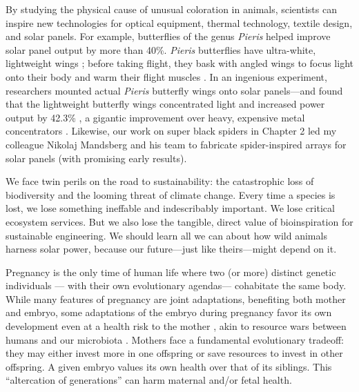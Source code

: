 \vspace{5mm}
\noindent{\textcolor{SchoolColor}{1.3 Bio-inspired Technology}}

By studying the physical cause of unusual coloration in animals, scientists can inspire new technologies for optical equipment, thermal technology, textile design, and solar panels\cite{Dou2020}. For example, butterflies of the genus \emph{Pieris} helped improve solar panel output by more than 40\%. \emph{Pieris} butterflies have ultra-white, lightweight wings \cite{Stavenga2004}; before taking flight, they bask with angled wings to focus light onto their body and warm their flight muscles \cite{Kingsolver1985}. In an ingenious experiment, researchers mounted actual \emph{Pieris} butterfly wings onto solar panels—and found that the  lightweight butterfly wings concentrated light and increased power output by 42.3\%  \cite{Shanks2015}, a gigantic improvement over heavy, expensive metal concentrators \cite{Barber2008, Tang2011}. Likewise, our work on super black spiders in Chapter 2 led my colleague Nikolaj Mandsberg and his team to fabricate spider-inspired arrays for solar panels (with promising early results). 

We face twin perils on the road to sustainability: the catastrophic loss of biodiversity and the looming threat of climate change. Every time a species is lost, we lose something ineffable and indescribably important. We lose critical ecosystem services. But we also lose the tangible, direct value of bioinspiration for sustainable engineering. We should learn all we can about how wild animals harness solar power, because our future—just like theirs—might depend on it.

\large{\newthought{\textcolor{SchoolColor}{2. Pregnancy in Humans and Other Mammals}}}

\normalsize 
Pregnancy is the only time of human life where two (or more) distinct genetic individuals — with their own evolutionary agendas— cohabitate the same body. While many features of pregnancy are joint adaptations, benefiting both mother and embryo, some adaptations of the embryo during pregnancy favor its own development even at a health risk to the mother \cite{Haig1993}, akin to resource wars between humans and our microbiota \cite{Wasielewski2016}. Mothers face a fundamental evolutionary tradeoff: they may either invest more in one offspring or save resources to invest in other offspring. A given embryo values its own health over that of its siblings. This “altercation of generations” \cite{Haig1996} can harm maternal and/or fetal health.

